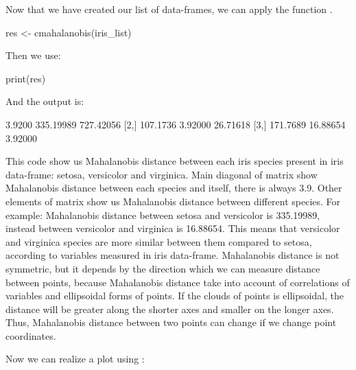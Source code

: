 \documentclass[article]{jss}
\begin{document}
Now that we have created our list of data-frames, we can apply the function . 
\begin{CodeChunk}
\begin{CodeInput}
res <- cmahalanobis(iris_list)
\end{CodeInput}
\end{CodeChunk}
Then we use:
\begin{CodeChunk}
\begin{CodeInput}
print(res)
\end{CodeInput}
\end{CodeChunk}
And the output is:
\begin{Code}
         [,1]      [,2]      [,3]
[1,]   3.9200 335.19989 727.42056
[2,] 107.1736   3.92000  26.71618
[3,] 171.7689  16.88654   3.92000
\end{Code}

This code show us Mahalanobis distance between each iris species present in iris data-frame: setosa, versicolor and virginica. Main diagonal of matrix show Mahalanobis distance between each species and itself, there is always 3.9. Other elements of matrix show us Mahalanobis distance between different species. For example: Mahalanobis distance between setosa and versicolor is 335.19989, instead between versicolor and virginica is 16.88654. This means that versicolor and virginica species are more similar between them compared to setosa, according to variables measured in iris data-frame.
Mahalanobis distance is not symmetric, but it depends by the direction which we can measure distance between points, because Mahalanobis distance take into account of correlations of variables and ellipsoidal forms of points. If the clouds of points is ellipsoidal, the distance will be greater along the shorter axes and smaller on the longer axes. Thus, Mahalanobis distance between two points can change if we change point coordinates. 

Now we can realize a plot using :

\begin{CodeChunk}
\end{CodeChunk}
\end{document}
